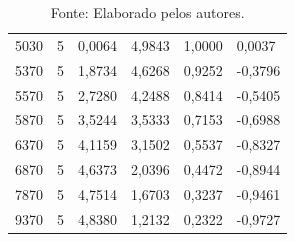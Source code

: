 \begin{table}[H]
\begin{center}
{\begin{tabular}{llllll}
				5030                       & 5                            & 0,0064                       & 4,9843                       & 1,0000                                 & 0,0037                                   \\
				5370                       & 5                            & 1,8734                       & 4,6268                       & 0,9252                                 & -0,3796                                  \\
				5570                       & 5                            & 2,7280                       & 4,2488                       & 0,8414                                 & -0,5405                                  \\
				5870                       & 5                            & 3,5244                       & 3,5333                       & 0,7153                                 & -0,6988                                  \\
				6370                       & 5                            & 4,1159                       & 3,1502                       & 0,5537                                 & -0,8327                                  \\
				6870                       & 5                            & 4,6373                       & 2,0396                       & 0,4472                                 & -0,8944                                  \\
				7870                       & 5                            & 4,7514                       & 1,6703                       & 0,3237                                 & -0,9461                                  \\
				9370                       & 5                            & 4,8380                       & 1,2132                       & 0,2322                                 & -0,9727                                  \\
				\hline
			\end{tabular}}

	\end{center}
	\caption*{Fonte: Elaborado pelos autores.}
	\label{tabela}
\end{table}

